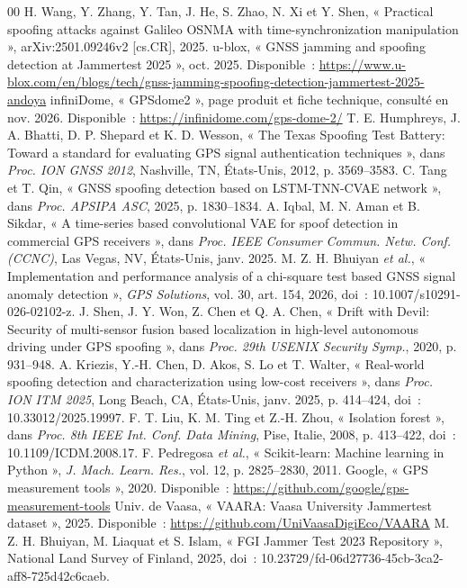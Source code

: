 \documentclass[conference]{IEEEtran}
\begin{document}
\begin{thebibliography}{00}
 H. Wang, Y. Zhang, Y. Tan, J. He, S. Zhao, N. Xi et Y. Shen, « Practical spoofing attacks against Galileo OSNMA with time-synchronization manipulation », arXiv:2501.09246v2 [cs.CR], 2025.
 u-blox, « GNSS jamming and spoofing detection at Jammertest 2025 », oct. 2025. Disponible~: \url{https://www.u-blox.com/en/blogs/tech/gnss-jamming-spoofing-detection-jammertest-2025-andoya}
 infiniDome, « GPSdome2 », page produit et fiche technique, consulté en nov. 2026. Disponible~: \url{https://infinidome.com/gps-dome-2/}
 T. E. Humphreys, J. A. Bhatti, D. P. Shepard et K. D. Wesson, « The Texas Spoofing Test Battery: Toward a standard for evaluating GPS signal authentication techniques », dans \emph{Proc. ION GNSS 2012}, Nashville, TN, États-Unis, 2012, p. 3569--3583.
 C. Tang et T. Qin, « GNSS spoofing detection based on LSTM-TNN-CVAE network », dans \emph{Proc. APSIPA ASC}, 2025, p. 1830--1834.
 A. Iqbal, M. N. Aman et B. Sikdar, « A time-series based convolutional VAE for spoof detection in commercial GPS receivers », dans \emph{Proc. IEEE Consumer Commun. Netw. Conf. (CCNC)}, Las Vegas, NV, États-Unis, janv. 2025.
 M. Z. H. Bhuiyan \emph{et al.}, « Implementation and performance analysis of a chi-square test based GNSS signal anomaly detection », \emph{GPS Solutions}, vol. 30, art. 154, 2026, doi~: 10.1007/s10291-026-02102-z.
 J. Shen, J. Y. Won, Z. Chen et Q. A. Chen, « Drift with Devil: Security of multi-sensor fusion based localization in high-level autonomous driving under GPS spoofing », dans \emph{Proc. 29th USENIX Security Symp.}, 2020, p. 931--948.
 A. Kriezis, Y.-H. Chen, D. Akos, S. Lo et T. Walter, « Real-world spoofing detection and characterization using low-cost receivers », dans \emph{Proc. ION ITM 2025}, Long Beach, CA, États-Unis, janv. 2025, p. 414--424, doi~: 10.33012/2025.19997.
 F. T. Liu, K. M. Ting et Z.-H. Zhou, « Isolation forest », dans \emph{Proc. 8th IEEE Int. Conf. Data Mining}, Pise, Italie, 2008, p. 413--422, doi~: 10.1109/ICDM.2008.17.
 F. Pedregosa \emph{et al.}, « Scikit-learn: Machine learning in Python », \emph{J. Mach. Learn. Res.}, vol. 12, p. 2825--2830, 2011.
 Google, « GPS measurement tools », 2020. Disponible~: \url{https://github.com/google/gps-measurement-tools}
 Univ. de Vaasa, « VAARA: Vaasa University Jammertest dataset », 2025. Disponible~: \url{https://github.com/UniVaasaDigiEco/VAARA}
 M. Z. H. Bhuiyan, M. Liaquat et S. Islam, « FGI Jammer Test 2023 Repository », National Land Survey of Finland, 2025, doi~: 10.23729/fd-06d27736-45cb-3ca2-aff8-725d42c6caeb.
\end{thebibliography}
\end{document}
